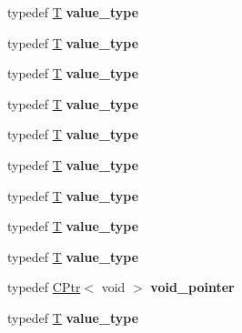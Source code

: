 \begin{DoxyCompactItemize}
typedef \mbox{\hyperlink{struct_t}{T}} {\bfseries value\+\_\+type}
\item 
\mbox{\label{struct_c_a096a21f71a76fee4bf3931999b507b9e}} 
typedef \mbox{\hyperlink{struct_t}{T}} {\bfseries value\+\_\+type}
\item 
\mbox{\label{struct_c_a096a21f71a76fee4bf3931999b507b9e}} 
typedef \mbox{\hyperlink{struct_t}{T}} {\bfseries value\+\_\+type}
\item 
\mbox{\label{struct_c_a096a21f71a76fee4bf3931999b507b9e}} 
typedef \mbox{\hyperlink{struct_t}{T}} {\bfseries value\+\_\+type}
\item 
\mbox{\label{struct_c_a096a21f71a76fee4bf3931999b507b9e}} 
typedef \mbox{\hyperlink{struct_t}{T}} {\bfseries value\+\_\+type}
\item 
\mbox{\label{struct_c_a096a21f71a76fee4bf3931999b507b9e}} 
typedef \mbox{\hyperlink{struct_t}{T}} {\bfseries value\+\_\+type}
\item 
\mbox{\label{struct_c_a096a21f71a76fee4bf3931999b507b9e}} 
typedef \mbox{\hyperlink{struct_t}{T}} {\bfseries value\+\_\+type}
\item 
\mbox{\label{struct_c_a096a21f71a76fee4bf3931999b507b9e}} 
typedef \mbox{\hyperlink{struct_t}{T}} {\bfseries value\+\_\+type}
\item 
\mbox{\label{struct_c_a096a21f71a76fee4bf3931999b507b9e}} 
typedef \mbox{\hyperlink{struct_t}{T}} {\bfseries value\+\_\+type}
\item 
\mbox{\label{struct_c_aa06bde389c72d40c9c7bd95e9c931842}} 
typedef \mbox{\hyperlink{struct_c_ptr}{C\+Ptr}}$<$ void $>$ {\bfseries void\+\_\+pointer}
\item 
\mbox{\label{struct_c_a096a21f71a76fee4bf3931999b507b9e}} 
typedef \mbox{\hyperlink{struct_t}{T}} {\bfseries value\+\_\+type}
\end{DoxyCompactItemize}
